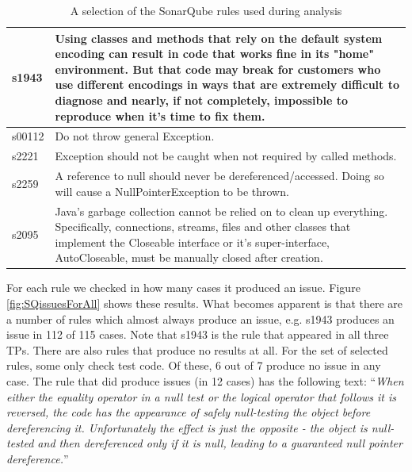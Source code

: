 \documentclass{uvamscse}
\begin{document}
\begin{table}[]
\begin{tabular}{lp{10cm}}
		s1943         & Using classes and methods that rely on the default system encoding can result in code that works fine in its "home" environment. But that code may break for customers who use different encodings in ways that are extremely difficult to diagnose and nearly, if not completely, impossible to reproduce when it's time to fix them.                             \\ \hline
		s00112        & Do not throw general Exception.                                                                                                                                                                                                                                                                                                                                    \\ \hline
		s2221         & Exception should not be caught when not required by called methods.                                                                                                                                                                                                                                                                                                \\ \hline
		s2259         & A reference to null should never be dereferenced/accessed. Doing so will cause a NullPointerException to be thrown.                                                                                                                                                                                                                                                \\ \hline
		s2095         & Java's garbage collection cannot be relied on to clean up everything. Specifically, connections, streams, files and other classes that implement the Closeable interface or it's super-interface, AutoCloseable, must be manually closed after creation.                                                                                                           \\ \hline
	\end{tabular}
	\caption{A selection of the SonarQube rules used during analysis}
\end{table}

For each rule we checked in how many cases it produced an issue. Figure \ref{fig:SQissuesForAll} shows these results. What becomes apparent is that there are a number of rules which almost always produce an issue, e.g. s1943 produces an issue in 112 of 115 cases. Note that s1943 is the rule that appeared in all three TPs. There are also rules that produce no results at all. For the set of selected rules, some only check test code. Of these, 6 out of 7 produce no issue in any case. The rule that did produce issues (in 12 cases) has the following text: ``\emph{When either the equality operator in a null test or the logical operator that follows it is reversed, the code has the appearance of safely null-testing the object before dereferencing it. Unfortunately the effect is just the opposite - the object is null-tested and then dereferenced only if it is null, leading to a guaranteed null pointer dereference.}'' 
\end{document}
